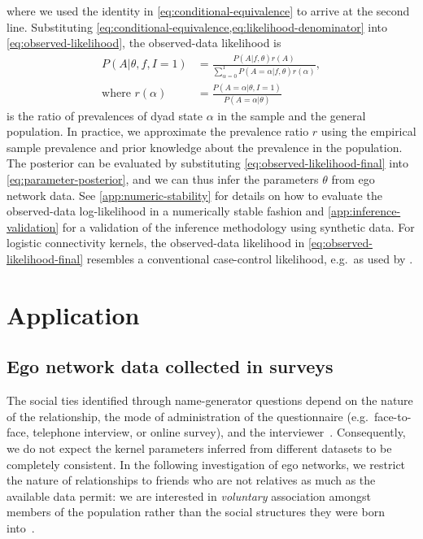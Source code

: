 \documentclass{scrartcl}
\begin{document}
where we used the identity in \cref{eq:conditional-equivalence} to arrive at the second line. Substituting \cref{eq:conditional-equivalence,eq:likelihood-denominator} into \cref{eq:observed-likelihood}, the observed-data likelihood is
\begin{align}
    P(A|\theta,f,I=1)&=\frac{P(A|f,\theta)r(A)}{\sum_{\alpha=0}^1 P(A=\alpha|f,\theta)r(\alpha)},\label{eq:observed-likelihood-final}\\
    \text{where }r(\alpha)&=\frac{P(A=\alpha|\theta,I=1)}{P(A=\alpha|\theta)}\nonumber
\end{align}
is the ratio of prevalences of dyad state $\alpha$ in the sample and the general population. In practice, we approximate the prevalence ratio $r$ using the empirical sample prevalence and prior knowledge about the prevalence in the population. The posterior can be evaluated by substituting \cref{eq:observed-likelihood-final} into \cref{eq:parameter-posterior}, and we can thus infer the parameters $\theta$ from ego network data. See \cref{app:numeric-stability} for details on how to evaluate the observed-data log-likelihood in a numerically stable fashion and \cref{app:inference-validation} for a validation of the inference methodology using synthetic data. For logistic connectivity kernels, the observed-data likelihood in \cref{eq:observed-likelihood-final} resembles a conventional case-control likelihood, e.g.\ as used by \textcite{Smith2014}.

\section{Application\label{sec:application}}

\subsection{Ego network data collected in surveys}

The social ties identified through name-generator questions depend on the nature of the relationship, the mode of administration of the questionnaire (e.g.\ face-to-face, telephone interview, or online survey), and the interviewer~\cite{Marin2004,Eagle2015}. Consequently, we do not expect the kernel parameters inferred from different datasets to be completely consistent. In the following investigation of ego networks, we restrict the nature of relationships to friends who are not relatives as much as the available data permit: we are interested in \emph{voluntary} association amongst members of the population rather than the social structures they were born into~\cite{Kalmijn2007}.
\end{document}
